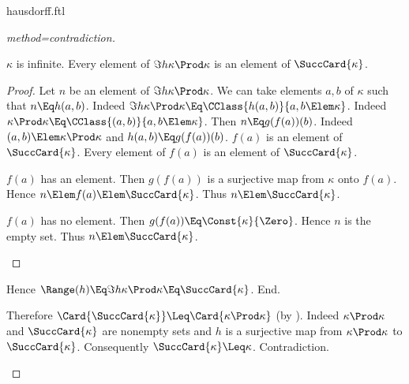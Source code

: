 \documentclass{stex}
\begin{document}
\begin{smodule}{hausdorff.ftl}
\begin{forthel}
\begin{proof}[method=contradiction]
\begin{case}{$\kappa$ is infinite.}
        Every element of $\Im{h}{\kappa \Prod \kappa}$ is an element of $\SuccCard{\kappa}$.
        \begin{proof}
          Let $n$ be an element of $\Im{h}{\kappa \Prod \kappa}$.
          We can take elements $a, b$ of $\kappa$ such that $n \Eq h(a,b)$.
          Indeed $\Im{h}{\kappa \Prod \kappa} \Eq \CClass{h(a,b)}{a,b \Elem\linebreak \kappa}$.
          Indeed $\kappa \Prod \kappa \Eq \CClass{(a,b)}{a,b \Elem \kappa}$.
          Then $n \Eq g(f(a))(b)$.
          Indeed $(a,b) \Elem \kappa \Prod \kappa$ and $h(a,b) \Eq g(f(a))(b)$.
          $f(a)$ is an element of $\SuccCard{\kappa}$.
          Every element of $f(a)$ is an element of $\SuccCard{\kappa}$.
  
          \begin{case}{$f(a)$ has an element.}
            Then $g(f(a))$ is a surjective map from $\kappa$ onto $f(a)$.
            Hence $n \Elem f(a) \Elem \SuccCard{\kappa}$.
            Thus $n \Elem \SuccCard{\kappa}$.
          \end{case}
  
          \begin{case}{$f(a)$ has no element.}
            Then $g(f(a)) \Eq \Const{\kappa}{\Zero}$.
            Hence $n$ is the empty set.
            Thus $n \Elem \SuccCard{\kappa}$.
          \end{case}
        \end{proof}
  
        Hence $\Range(h) \Eq \Im{h}{\kappa \Prod \kappa} \Eq \SuccCard{\kappa}$.
      End.
  
      Therefore $\Card{\SuccCard{\kappa}} \Leq \Card{\kappa \Prod \kappa}$ (by ).
      Indeed $\kappa \Prod \kappa$ and $\SuccCard{\kappa}$ are nonempty sets and $h$ is a surjective map from $\kappa \Prod \kappa$ to $\SuccCard{\kappa}$.
      Consequently $\SuccCard{\kappa} \Leq \kappa$.
      Contradiction.
    \end{case}
  \end{proof}
\end{forthel}

\printbibliography
{}

\end{smodule}
\end{document}
